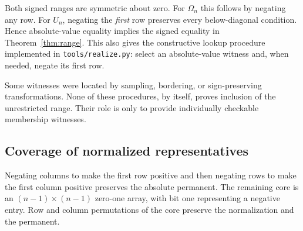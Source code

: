 \documentclass[11pt,a4paper]{article}
\theoremstyle{remark}\newtheorem{remark}[theorem]{Remark}
\newcommand{\Om}{\Omega}
\begin{document}
Both signed ranges are symmetric about zero. For $\Om_n$ this follows by negating any row. For $U_n$, negating the \emph{first} row preserves every below-diagonal condition. Hence absolute-value equality implies the signed equality in Theorem~\ref{thm:range}. This also gives the constructive lookup procedure implemented in \texttt{tools/realize.py}: select an absolute-value witness and, when needed, negate its first row.

Some witnesses were located by sampling, bordering, or sign-preserving transformations. None of these procedures, by itself, proves inclusion of the unrestricted range. Their role is only to provide individually checkable membership witnesses.

\subsection{Coverage of normalized representatives}
Negating columns to make the first row positive and then negating rows to make the first column positive preserves the absolute permanent. The remaining core is an $(n-1)\times(n-1)$ zero-one array, with bit one representing a negative entry. Row and column permutations of the core preserve the normalization and the permanent.
\end{document}
